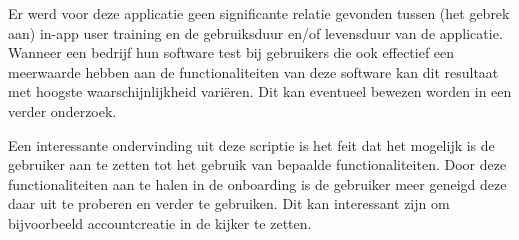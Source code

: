 Er werd voor deze applicatie geen significante relatie gevonden tussen (het gebrek aan) in-app user training en de gebruiksduur en/of levensduur van de applicatie. Wanneer een bedrijf hun software test bij gebruikers die ook effectief een meerwaarde hebben aan de functionaliteiten van deze software kan dit resultaat met hoogste waarschijnlijkheid variëren. Dit kan eventueel bewezen worden in een verder onderzoek.

Een interessante ondervinding uit deze scriptie is het feit dat het mogelijk is de gebruiker aan te zetten tot het gebruik van bepaalde functionaliteiten. Door deze functionaliteiten aan te halen in de onboarding is de gebruiker meer geneigd deze daar uit te proberen en verder te gebruiken. Dit kan interessant zijn om bijvoorbeeld accountcreatie in de kijker te zetten.
